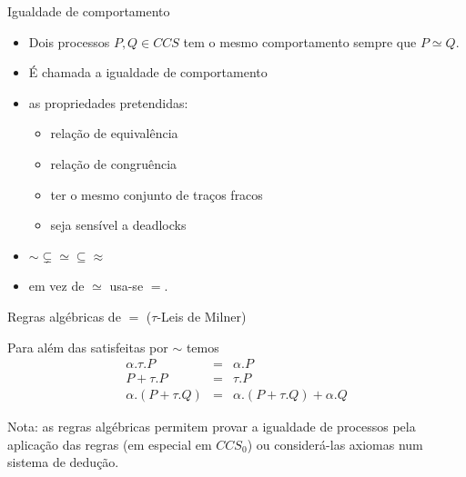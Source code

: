 \documentclass[aspectratio=169]{beamer}
\begin{document}
\begin{frame}{Igualdade de comportamento}
\begin{itemize}[<+->]
	\item Dois processos $P,Q\in CCS$ \alert{tem o mesmo comportamento} sempre que $P\simeq Q$.
\item  É chamada a \alert{igualdade de comportamento}
\item as propriedades pretendidas:
\begin{itemize}
\item relação de equivalência
\item  relação de congruência
\item ter o mesmo conjunto de traços \alert{fracos}
\item seja sensível a deadlocks
\end{itemize}
\item $\sim \subsetneq\simeq\subseteq \approx$
\item em vez de $\simeq$ usa-se $=$.
\end{itemize}

\end{frame}
\begin{frame}{Regras algébricas de $=$ ($\tau$-Leis de Milner)}

Para além das satisfeitas por $\sim$ temos
\begin{eqnarray*}
	\alpha.\tau.P&=&\alpha.P\\
P+\tau.P&=&\tau.P\\
\alpha.(P+\tau.Q)&=&\alpha.(P+\tau.Q)+\alpha.Q 
\end{eqnarray*}	

Nota: as regras algébricas permitem provar a igualdade de processos pela aplicação das regras (em especial em $CCS_0$) ou considerá-las axiomas num sistema de dedução.
\end{frame}
\end{document}
